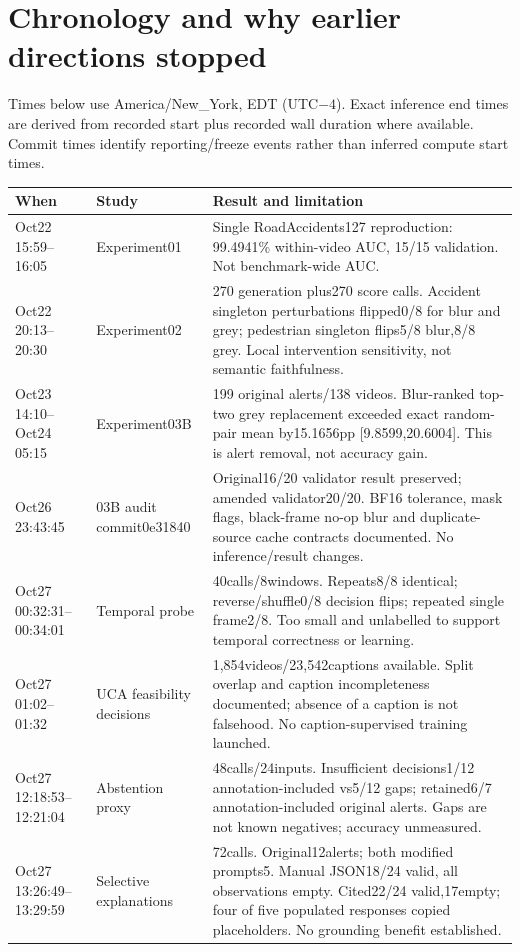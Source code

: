 \documentclass[10pt]{article}
\begin{document}
\section{Chronology and why earlier directions stopped}
Times below use America/New\_York, EDT (UTC$-4$). Exact inference end times are derived from recorded start plus recorded wall duration where available. Commit times identify reporting/freeze events rather than inferred compute start times.
\small\begin{longtable}{p{2.65cm}p{3.1cm}p{9.0cm}}\toprule
When & Study & Result and limitation\\\midrule\endhead
Oct22 15:59--16:05 & Experiment01 & Single RoadAccidents127 reproduction: 99.4941\% within-video AUC, 15/15 validation. Not benchmark-wide AUC.\\
Oct22 20:13--20:30 & Experiment02 & 270 generation plus270 score calls. Accident singleton perturbations flipped0/8 for blur and grey; pedestrian singleton flips5/8 blur,8/8 grey. Local intervention sensitivity, not semantic faithfulness.\\
Oct23 14:10--Oct24 05:15 & Experiment03B & 199 original alerts/138 videos. Blur-ranked top-two grey replacement exceeded exact random-pair mean by15.1656pp [9.8599,20.6004]. This is alert removal, not accuracy gain.\\
Oct26 23:43:45 & 03B audit commit0e31840 & Original16/20 validator result preserved; amended validator20/20. BF16 tolerance, mask flags, black-frame no-op blur and duplicate-source cache contracts documented. No inference/result changes.\\
Oct27 00:32:31--00:34:01 & Temporal probe &40calls/8windows. Repeats8/8 identical; reverse/shuffle0/8 decision flips; repeated single frame2/8. Too small and unlabelled to support temporal correctness or learning.\\
Oct27 01:02--01:32 & UCA feasibility decisions &1,854videos/23,542captions available. Split overlap and caption incompleteness documented; absence of a caption is not falsehood. No caption-supervised training launched.\\
Oct27 12:18:53--12:21:04 & Abstention proxy &48calls/24inputs. Insufficient decisions1/12 annotation-included vs5/12 gaps; retained6/7 annotation-included original alerts. Gaps are not known negatives; accuracy unmeasured.\\
Oct27 13:26:49--13:29:59 & Selective explanations &72calls. Original12alerts; both modified prompts5. Manual JSON18/24 valid, all observations empty. Cited22/24 valid,17empty; four of five populated responses copied placeholders. No grounding benefit established.\\

\end{longtable}
\end{document}
